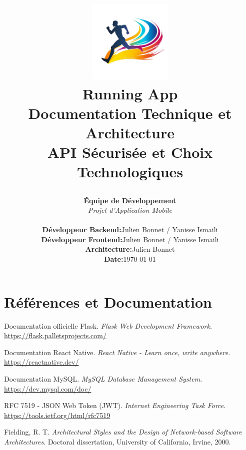 \documentclass[12pt,a4paper]{article}
\title{
    \vspace{-2cm}
    \begin{center}
    \includegraphics[width=0.3\textwidth]{logo_running.png}\\[1cm]
    {\Huge\textbf{Running App}}\\[0.5cm]
    {\Large Documentation Technique et Architecture}\\[0.3cm]
    {\large API Sécurisée et Choix Technologiques}
    \end{center}
    \vspace{1cm}
}
\author{
    \textbf{Équipe de Développement}\\
    \textit{Projet d'Application Mobile}\\[0.5cm]
    \begin{tabular}{ll}
    \textbf{Développeur Backend:} & Julien Bonnet / Yanisse Ismaili \\
    \textbf{Développeur Frontend:} & Julien Bonnet / Yanisse Ismaili \\
    \textbf{Architecture:} & Julien Bonnet \\
    \textbf{Date:} & \today
    \end{tabular}
}
\date{}
\begin{document}
\maketitle
\thispagestyle{empty}

\newpage

\tableofcontents
\thispagestyle{empty}
\newpage

\setcounter{page}{1}



\newpage


\newpage


\newpage


\newpage


\newpage


\newpage




\newpage
\section{Références et Documentation}

\begin{thebibliography}{10}

Documentation officielle Flask.
\textit{Flask Web Development Framework}.
\url{https://flask.palletsprojects.com/}

Documentation React Native.
\textit{React Native - Learn once, write anywhere}.
\url{https://reactnative.dev/}

Documentation MySQL.
\textit{MySQL Database Management System}.
\url{https://dev.mysql.com/doc/}

RFC 7519 - JSON Web Token (JWT).
\textit{Internet Engineering Task Force}.
\url{https://tools.ietf.org/html/rfc7519}

Fielding, R. T.
\textit{Architectural Styles and the Design of Network-based Software Architectures}.
Doctoral dissertation, University of California, Irvine, 2000.

\end{thebibliography}
\end{document}
